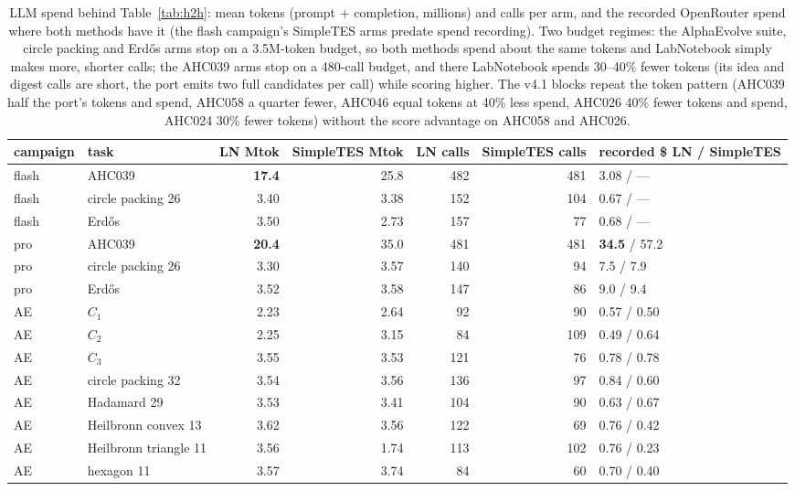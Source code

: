 \begin{table}[H]\centering\small
\caption{LLM spend behind Table~\ref{tab:h2h}: mean tokens (prompt + completion, millions) and calls
per arm, and the recorded OpenRouter spend where both methods have it (the flash campaign's
SimpleTES arms predate spend recording). Two budget regimes: the AlphaEvolve suite, circle packing
and Erd\H{o}s arms stop on a 3.5M-token budget, so both methods spend about the same tokens and
LabNotebook simply makes more, shorter calls; the AHC039 arms stop on a 480-call budget, and there
LabNotebook spends 30--40\% fewer tokens (its idea and digest calls are short, the port emits two
full candidates per call) while scoring higher. The v4.1 blocks repeat the token pattern (AHC039
half the port's tokens and spend, AHC058 a quarter fewer, AHC046 equal tokens at 40\% less spend,
AHC026 40\% fewer tokens and spend, AHC024 30\% fewer tokens) without the score advantage on AHC058
and AHC026.}
\label{tab:h2hcost}
\begin{tabular}{@{}llrrrrl@{}}
\toprule
campaign & task & LN Mtok & SimpleTES Mtok & LN calls & SimpleTES calls & recorded \$ LN / SimpleTES \\
\midrule
flash & AHC039 & \textbf{17.4} & 25.8 & 482 & 481 & 3.08 / --- \\
flash & circle packing 26 & 3.40 & 3.38 & 152 & 104 & 0.67 / --- \\
flash & Erd\H{o}s & 3.50 & 2.73 & 157 & 77 & 0.68 / --- \\
pro & AHC039 & \textbf{20.4} & 35.0 & 481 & 481 & \textbf{34.5} / 57.2 \\
pro & circle packing 26 & 3.30 & 3.57 & 140 & 94 & 7.5 / 7.9 \\
pro & Erd\H{o}s & 3.52 & 3.58 & 147 & 86 & 9.0 / 9.4 \\
AE & $C_1$ & 2.23 & 2.64 & 92 & 90 & 0.57 / 0.50 \\
AE & $C_2$ & 2.25 & 3.15 & 84 & 109 & 0.49 / 0.64 \\
AE & $C_3$ & 3.55 & 3.53 & 121 & 76 & 0.78 / 0.78 \\
AE & circle packing 32 & 3.54 & 3.56 & 136 & 97 & 0.84 / 0.60 \\
AE & Hadamard 29 & 3.53 & 3.41 & 104 & 90 & 0.63 / 0.67 \\
AE & Heilbronn convex 13 & 3.62 & 3.56 & 122 & 69 & 0.76 / 0.42 \\
AE & Heilbronn triangle 11 & 3.56 & 1.74 & 113 & 102 & 0.76 / 0.23 \\
AE & hexagon 11 & 3.57 & 3.74 & 84 & 60 & 0.70 / 0.40 \\

\end{tabular}
\end{table}
